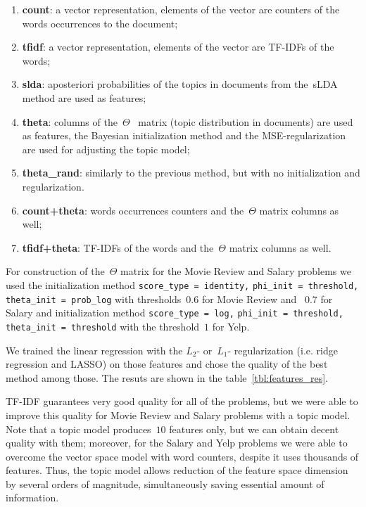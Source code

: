 \documentclass{sig-alternate-2013}
\begin{document}
\begin{enumerate}
    \item \textbf{count}: a vector representation, elements of the vector are counters of the words occurrences to the document;
    \item \textbf{tfidf}: a vector representation, elements of the vector are TF-IDFs of the words;
    \item \textbf{slda}: aposteriori probabilities of the topics in documents from the~sLDA~\cite{blei07supervised} method are used  as features;
    \item \textbf{theta}: columns of the~$\Theta$~ matrix (topic distribution in documents) are used as features, the Bayesian initialization method and the MSE-regularization are used for adjusting the topic model;
    \item \textbf{theta\_rand}: similarly to the previous method, but with no initialization and regularization.
    \item \textbf{count+theta}: words occurrences counters and the~$\Theta$ matrix columns as well;
    \item \textbf{tfidf+theta}: TF-IDFs of the words and the~$\Theta$ matrix columns as well.
\end{enumerate}

For construction of the~$\Theta$ matrix for the Movie Review and Salary problems we used the
initialization method \texttt{score\_type = identity,} \texttt{phi\_init = threshold,}
\texttt{theta\_init = prob\_log}
with thresholds~$0.6$ for Movie Review and ~$0.7$ for Salary
and initialization method \texttt{score\_type = log,} \texttt{phi\_init = threshold,}
\texttt{theta\_init = threshold}
with the threshold~$1$ for Yelp.

We trained the linear regression with the $L_2$- or~$L_1$- regularization (i.e. ridge regression and LASSO)  on those features and chose the quality of the best method among those.
The resuts are shown in the table~\ref{tbl:features_res}.

TF-IDF guarantees very good quality for all of the problems,
but we were able to improve this quality for Movie Review and Salary
problems with a topic model.
Note that a topic model produces~$10$ features only,
but we can obtain decent quality with them;
moreover, for the Salary and Yelp problems we were able to overcome the vector space model with word counters, despite it uses thousands of features.
Thus, the topic model allows reduction of the feature space dimension by several orders of magnitude,
simultaneously saving essential amount of information.
\end{document}

